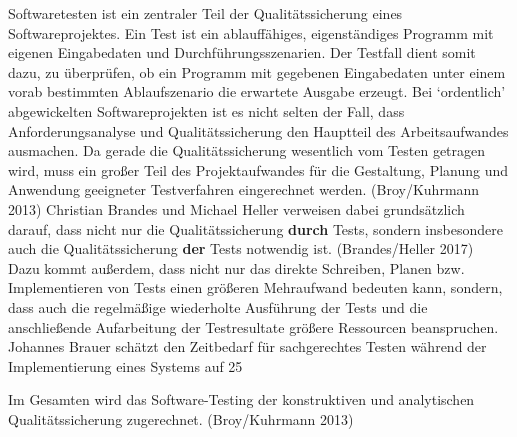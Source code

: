 \documentclass{article}
\begin{document}
    Softwaretesten ist ein zentraler Teil der Qualitätssicherung eines Softwareprojektes. Ein Test ist ein ablauffähiges, eigenständiges Programm mit eigenen Eingabedaten und Durchführungsszenarien. Der Testfall dient somit dazu, zu überprüfen, ob ein Programm mit gegebenen Eingabedaten unter einem vorab bestimmten Ablaufszenario die erwartete Ausgabe erzeugt. Bei ‘ordentlich’ abgewickelten Softwareprojekten ist es nicht selten der Fall, dass Anforderungsanalyse und Qualitätssicherung den Hauptteil des Arbeitsaufwandes ausmachen. Da gerade die Qualitätssicherung wesentlich vom Testen getragen wird, muss ein großer Teil des Projektaufwandes für die Gestaltung, Planung und Anwendung geeigneter Testverfahren eingerechnet werden. (Broy/Kuhrmann 2013) Christian Brandes und Michael Heller verweisen dabei grundsätzlich darauf, dass nicht nur die Qualitätssicherung \textbf{durch}  Tests, sondern insbesondere auch die Qualitätssicherung \textbf{der}  Tests notwendig ist. (Brandes/Heller 2017)\\
            
        Dazu kommt außerdem, dass nicht nur das direkte Schreiben, Planen bzw. Implementieren von Tests einen größeren Mehraufwand bedeuten kann, sondern, dass auch die regelmäßige wiederholte Ausführung der Tests und die anschließende Aufarbeitung der Testresultate größere Ressourcen beanspruchen. Johannes Brauer schätzt den Zeitbedarf für sachgerechtes Testen während der Implementierung eines Systems auf  25%
            
        Im Gesamten wird das Software-Testing der konstruktiven und analytischen Qualitätssicherung zugerechnet. (Broy/Kuhrmann 2013)\\
            
\end{document}
